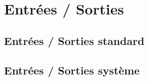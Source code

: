 \section{Entrées / Sorties}

	\subsection{Entrées / Sorties standard }
	
	\subsection{Entrées / Sorties système }
	
	